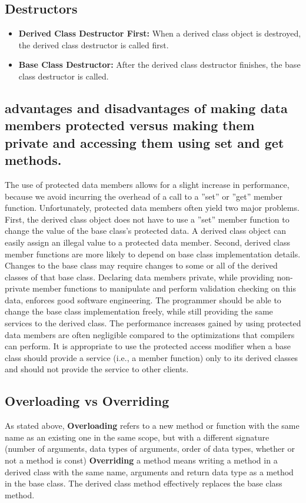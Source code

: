\documentclass{report}
\begin{document}
    \bigbreak \noindent 
    \subsection{Destructors}
    \begin{itemize}
        \item \textbf{Derived Class Destructor First:} When a derived class object is destroyed, the derived class destructor is called first.
        \item \textbf{Base Class Destructor:} After the derived class destructor finishes, the base class destructor is called.
    \end{itemize}

    \bigbreak \noindent 
    \subsection{advantages and disadvantages of making data members protected versus making them private and accessing them using set and get methods.}
    \bigbreak \noindent 
    The use of protected data members allows for a slight increase in performance, because we
    avoid incurring the overhead of a call to a ”set” or ”get” member function. Unfortunately,
    protected data members often yield two major problems. First, the derived class object does
    not have to use a ”set” member function to change the value of the base class’s protected
    data. A derived class object can easily assign an illegal value to a protected data member.
    Second, derived class member functions are more likely to depend on base class implementation details. Changes to the base class may require changes to some or all of the derived
    classes of that base class.
    \bigbreak \noindent 
    Declaring data members private, while providing non-private member functions to manipulate and perform validation checking on this data, enforces good software engineering. The
    programmer should be able to change the base class implementation freely, while still providing the same services to the derived class. The performance increases gained by using
    protected data members are often negligible compared to the optimizations that compilers
    can perform. It is appropriate to use the protected access modifier when a base class should
    provide a service (i.e., a member function) only to its derived classes and should not provide
    the service to other clients.

    \bigbreak \noindent 
    \subsection{Overloading vs Overriding}
    \bigbreak \noindent 
    As stated above, \textbf{Overloading} refers to a new method or function with the same name as an existing one
    in the same scope, but with a different signature (number of arguments, data types of
    arguments, order of data types, whether or not a method is const)
    \bigbreak \noindent 
    \textbf{Overriding} a method means writing a method in a derived class with the same name,
    arguments and return data type as a method in the base class. The derived class
    method effectively replaces the base class method.
\end{document}
